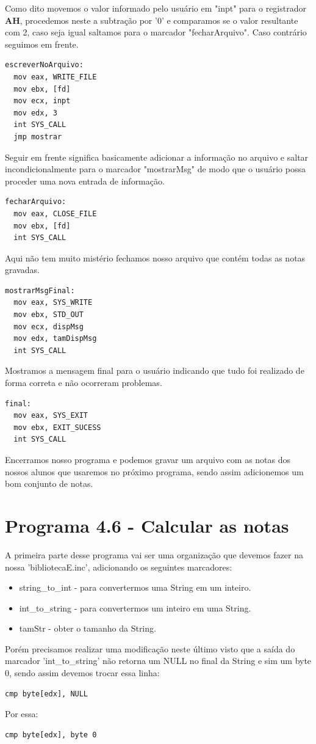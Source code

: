 Como dito movemos o valor informado pelo usuário em "inpt" para o registrador \textbf{AH}, procedemos neste a subtração por '0' e comparamos se o valor resultante com 2, caso seja igual saltamos para o marcador "fecharArquivo". Caso contrário seguimos em frente.
\begin{lstlisting}[]
escreverNoArquivo:
  mov eax, WRITE_FILE
  mov ebx, [fd]
  mov ecx, inpt
  mov edx, 3
  int SYS_CALL
  jmp mostrar	
\end{lstlisting}

Seguir em frente significa basicamente adicionar a informação no arquivo e saltar incondicionalmente para o marcador "mostrarMsg" de modo que o usuário possa proceder uma nova entrada de informação.
\begin{lstlisting}[]
fecharArquivo:
  mov eax, CLOSE_FILE
  mov ebx, [fd]
  int SYS_CALL	
\end{lstlisting}

Aqui não tem muito mistério fechamos nosso arquivo que contém todas as notas gravadas.
\begin{lstlisting}[]
mostrarMsgFinal:
  mov eax, SYS_WRITE
  mov ebx, STD_OUT
  mov ecx, dispMsg
  mov edx, tamDispMsg
  int SYS_CALL	
\end{lstlisting}

Mostramos a mensagem final para o usuário indicando que tudo foi realizado de forma correta e não ocorreram problemas.
\begin{lstlisting}[]
final:
  mov eax, SYS_EXIT
  mov ebx, EXIT_SUCESS
  int SYS_CALL
\end{lstlisting}

Encerramos nosso programa e podemos gravar um arquivo com as notas dos nossos alunos que usaremos no próximo programa, sendo assim adicionemos um bom conjunto de notas.

\section{Programa 4.6 - Calcular as notas}
A primeira parte desse programa vai ser uma organização que devemos fazer na nossa 'bibliotecaE.inc', adicionando os seguintes marcadores:
\begin{itemize}[nolistsep]
	\item string\_to\_int - para convertermos uma String em um inteiro.
	\item int\_to\_string - para convertermos um inteiro em uma String.
	\item tamStr - obter o tamanho da String.
\end{itemize}

Porém precisamos realizar uma modificação neste último visto que a saída do marcador 'int\_to\_string' não retorna um NULL no final da String e sim um byte 0, sendo assim devemos trocar essa linha:
\begin{lstlisting}[]
  cmp byte[edx], NULL
\end{lstlisting}

Por essa:
\begin{lstlisting}[]
  cmp byte[edx], byte 0
\end{lstlisting}


\clearpage